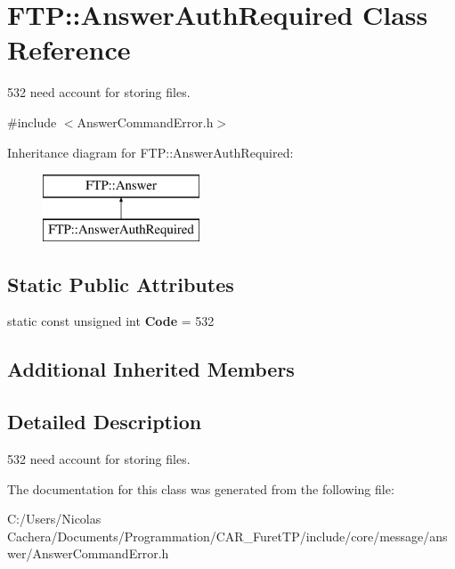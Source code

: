 \hypertarget{classFTP_1_1AnswerAuthRequired}{}\section{F\+T\+P\+:\+:Answer\+Auth\+Required Class Reference}
\label{classFTP_1_1AnswerAuthRequired}


532 need account for storing files.  




{\ttfamily \#include $<$Answer\+Command\+Error.\+h$>$}

Inheritance diagram for F\+T\+P\+:\+:Answer\+Auth\+Required\+:\begin{figure}[H]
\begin{center}
\leavevmode
\includegraphics[height=2.000000cm]{classFTP_1_1AnswerAuthRequired}
\end{center}
\end{figure}
\subsection*{Static Public Attributes}
\begin{DoxyCompactItemize}
\item 
\hypertarget{classFTP_1_1AnswerAuthRequired_a0b31d375012cdc068704bcf4d1a88bf3}{}static const unsigned int {\bfseries Code} = 532\label{classFTP_1_1AnswerAuthRequired_a0b31d375012cdc068704bcf4d1a88bf3}

\end{DoxyCompactItemize}
\subsection*{Additional Inherited Members}


\subsection{Detailed Description}
532 need account for storing files. 

The documentation for this class was generated from the following file\+:\begin{DoxyCompactItemize}
\item 
C\+:/\+Users/\+Nicolas Cachera/\+Documents/\+Programmation/\+C\+A\+R\+\_\+\+Furet\+T\+P/include/core/message/answer/Answer\+Command\+Error.\+h\end{DoxyCompactItemize}
